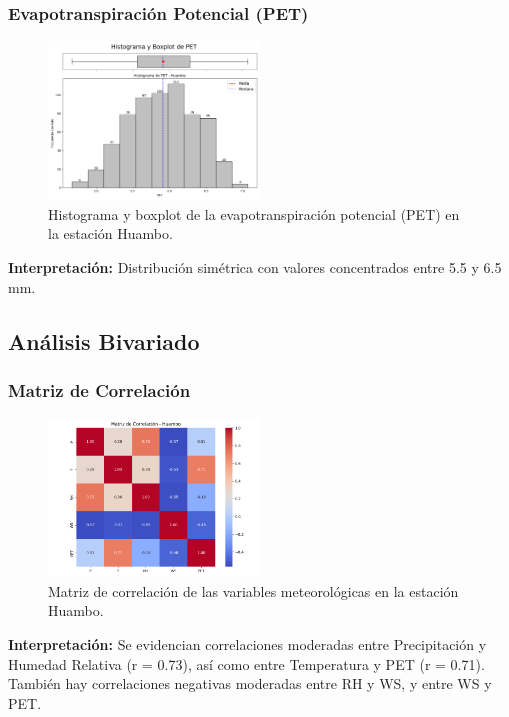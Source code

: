 \subsubsection*{Evapotranspiración Potencial (PET)}
\begin{figure}[H]
\centering
\includegraphics[width=0.5\textwidth]{resultados/por_estacion_meteorologica/Huambo/PET_histograma.png}
\caption{Histograma y boxplot de la evapotranspiración potencial (PET) en la estación Huambo.}
\label{fig:huambo_PET}
\end{figure}
\textbf{Interpretación:} Distribución simétrica con valores concentrados entre 5.5 y 6.5 mm.

\subsection{Análisis Bivariado}

\subsubsection*{Matriz de Correlación}
\begin{figure}[H]
\centering
\includegraphics[width=0.5\textwidth]{resultados/por_estacion_meteorologica/Huambo/matriz_correlacion.png}
\caption{Matriz de correlación de las variables meteorológicas en la estación Huambo.}
\label{fig:huambo_corr}
\end{figure}
\textbf{Interpretación:} Se evidencian correlaciones moderadas entre Precipitación y Humedad Relativa (r = 0.73), así como entre Temperatura y PET (r = 0.71). También hay correlaciones negativas moderadas entre RH y WS, y entre WS y PET.

